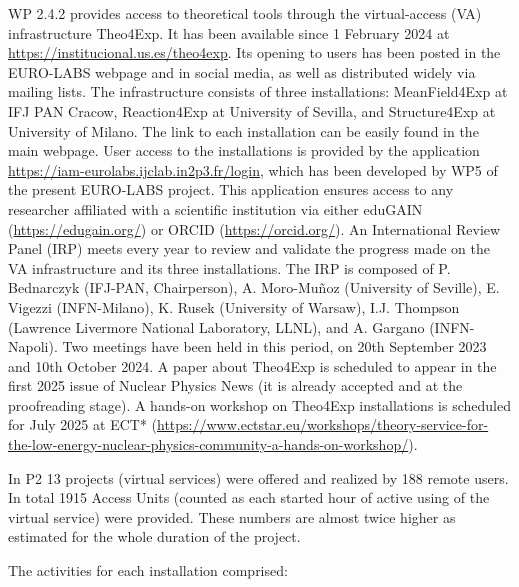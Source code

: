 WP 2.4.2 provides access to theoretical tools through the virtual-access (VA) infrastructure Theo4Exp. It has been available since 1 February 2024 at \url{https://institucional.us.es/theo4exp}. Its opening to users has been posted in the EURO-LABS webpage and in social media, as well as distributed widely via mailing lists. The infrastructure consists of three installations: MeanField4Exp at IFJ PAN Cracow, Reaction4Exp at University of Sevilla, and Structure4Exp at University of Milano. The link to each installation can be easily found in the main webpage. User access to the installations is provided by the application \url{https://iam-eurolabs.ijclab.in2p3.fr/login}, which has been developed by WP5 of the present EURO-LABS project. This application ensures access to any researcher affiliated with a scientific institution via either eduGAIN (\url{https://edugain.org/}) or ORCID (\url{https://orcid.org/}).
An International Review Panel (IRP) meets every year to review and validate the progress made on the VA infrastructure and its three installations. The IRP is composed of P. Bednarczyk (IFJ-PAN, Chairperson), A. Moro-Mu\~noz (University of Seville), E. Vigezzi (INFN-Milano), K. Rusek (University of Warsaw), I.J. Thompson (Lawrence Livermore National Laboratory, LLNL), and A. Gargano (INFN-Napoli). Two meetings have been held in this period, on 20th September 2023 and 10th October 2024. A paper about Theo4Exp is scheduled to appear in the first 2025 issue of Nuclear Physics News (it is already accepted and at the proofreading stage). A hands-on workshop on Theo4Exp installations is scheduled for July 2025 at ECT* (\url{https://www.ectstar.eu/workshops/theory-service-for-the-low-energy-nuclear-physics-community-a-hands-on-workshop/}).

In P2 13 projects (virtual services) were offered and realized by 188 remote users. In total 1915 Access Units (counted as each started hour of active using of the virtual service) were provided. These numbers are almost twice higher as estimated for the whole duration of the project.

The activities for each installation comprised:

